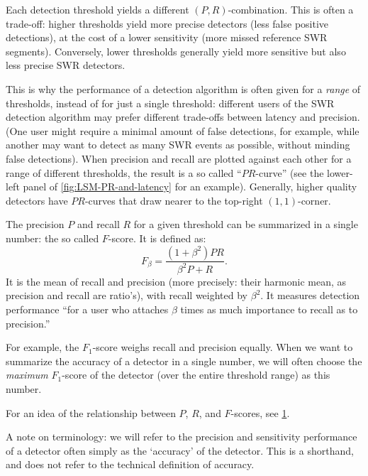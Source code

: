 Each detection threshold yields a different $(P, R)$-combination. This is often a trade-off: higher thresholds yield more precise detectors (less false positive detections), at the cost of a lower sensitivity (more missed reference SWR segments). Conversely, lower thresholds generally yield more sensitive but also less precise SWR detectors.

This is why the performance of a detection algorithm is often given for a \emph{range} of thresholds, instead of for just a single threshold: different users of the SWR detection algorithm may prefer different trade-offs between latency and precision. (One user might require a minimal amount of false detections, for example, while another may want to detect as many SWR events as possible, without minding false detections). When precision and recall are plotted against each other for a range of different thresholds, the result is a so called ``$PR$-curve'' (see the lower-left panel of \cref{fig:LSM-PR-and-latency} for an example). Generally, higher quality detectors have $PR$-curves that draw nearer to the top-right $(1, 1)$-corner.

\begin{figure}
\label{fig:iso-F-lines}
\end{figure}

The precision $P$ and recall $R$ for a given threshold can be summarized in a single number: the so called $F$-score. It is defined as:
\begin{equation}
F_\beta = \frac{(1+\beta^2) P R}{\beta^2 P + R}.
\end{equation}
It is the mean of recall and precision (more precisely: their harmonic mean, as precision and recall are ratio's), with recall weighted by $\beta^2$. It measures detection performance ``for a user who attaches $\beta$ times as much importance to recall as to precision.'' \cite{Rijsbergen1979}

For example, the $F_1$-score weighs recall and precision equally. When we want to summarize the accuracy of a detector in a single number, we will often choose the \emph{maximum} $F_1$-score of the detector (over the entire threshold range) as this number.

For an idea of the relationship between $P$, $R$, and $F$-scores, see \cref{fig:iso-F-lines}.

A note on terminology: we will refer to the precision and sensitivity performance of a detector often simply as the `accuracy' of the detector. This is a shorthand, and does not refer to the technical definition of accuracy.\footnotemark{}

